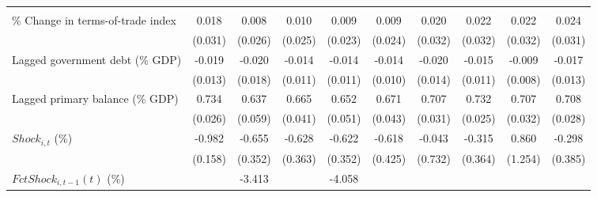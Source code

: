 {\begin{tabular}{l*{9}{c}}
                    &                     &                     &                     &                     &                     &                     &                     &                     &                     \\
\addlinespace
\% Change in terms-of-trade index&       0.018         &       0.008         &       0.010         &       0.009         &       0.009         &       0.020         &       0.022         &       0.022         &       0.024         \\
                    &     (0.031)         &     (0.026)         &     (0.025)         &     (0.023)         &     (0.024)         &     (0.032)         &     (0.032)         &     (0.032)         &     (0.031)         \\
\addlinespace
Lagged government debt (\% GDP)&      -0.019         &      -0.020         &      -0.014         &      -0.014         &      -0.014         &      -0.020         &      -0.015         &      -0.009         &      -0.017         \\
                    &     (0.013)         &     (0.018)         &     (0.011)         &     (0.011)         &     (0.010)         &     (0.014)         &     (0.011)         &     (0.008)         &     (0.013)         \\
\addlinespace
Lagged primary balance (\% GDP)&       0.734\sym{***}&       0.637\sym{***}&       0.665\sym{***}&       0.652\sym{***}&       0.671\sym{***}&       0.707\sym{***}&       0.732\sym{***}&       0.707\sym{***}&       0.708\sym{***}\\
                    &     (0.026)         &     (0.059)         &     (0.041)         &     (0.051)         &     (0.043)         &     (0.031)         &     (0.025)         &     (0.032)         &     (0.028)         \\
\addlinespace
$ Shock_{i,t}$ (\%) &      -0.982\sym{***}&      -0.655\sym{*}  &      -0.628         &      -0.622         &      -0.618         &      -0.043         &      -0.315         &       0.860         &      -0.298         \\
                    &     (0.158)         &     (0.352)         &     (0.363)         &     (0.352)         &     (0.425)         &     (0.732)         &     (0.364)         &     (1.254)         &     (0.385)         \\
\addlinespace
$ FctShock_{i,t-1}(t)$ (\%)&                     &      -3.413         &                     &      -4.058         &                     &                     &                     &                     &                     \\

\end{tabular}}
